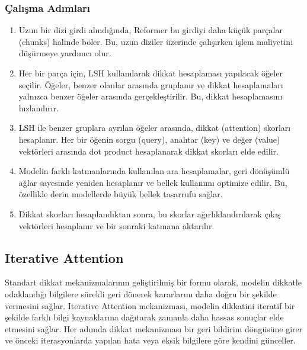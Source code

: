 \subsubsection{Çalışma Adımları}

\begin{enumerate}
    \item Uzun bir dizi girdi alındığında, Reformer bu girdiyi daha küçük parçalar (chunks) halinde böler. Bu, uzun diziler üzerinde çalışırken işlem maliyetini düşürmeye yardımcı olur.
    \item Her bir parça için, LSH kullanılarak dikkat hesaplaması yapılacak öğeler seçilir. Öğeler, benzer olanlar arasında gruplanır ve dikkat hesaplamaları yalnızca benzer öğeler arasında gerçekleştirilir. Bu, dikkat hesaplamasını hızlandırır.
    \item LSH ile benzer gruplara ayrılan öğeler arasında, dikkat (attention) skorları hesaplanır. Her bir öğenin sorgu (query), anahtar (key) ve değer (value) vektörleri arasında dot product hesaplanarak dikkat skorları elde edilir.
    \item Modelin farklı katmanlarında kullanılan ara hesaplamalar, geri dönüşümlü ağlar sayesinde yeniden hesaplanır ve bellek kullanımı optimize edilir. Bu, özellikle derin modellerde büyük bellek tasarrufu sağlar.
    \item Dikkat skorları hesaplandıktan sonra, bu skorlar ağırlıklandırılarak çıkış vektörleri hesaplanır ve bir sonraki katmana aktarılır.
\end{enumerate}

\newpage

\subsection{Iterative Attention}

Standart dikkat mekanizmalarının geliştirilmiş bir formu olarak, modelin dikkatle odaklandığı bilgilere sürekli geri dönerek kararlarını daha doğru bir şekilde vermesini sağlar. Iterative Attention mekanizması, modelin dikkatini iteratif bir şekilde farklı bilgi kaynaklarına dağıtarak zamanla daha hassas sonuçlar elde etmesini sağlar. Her adımda dikkat mekanizması bir geri bildirim döngüsüne girer ve önceki iterasyonlarda yapılan hata veya eksik bilgilere göre kendini günceller.

\newpage